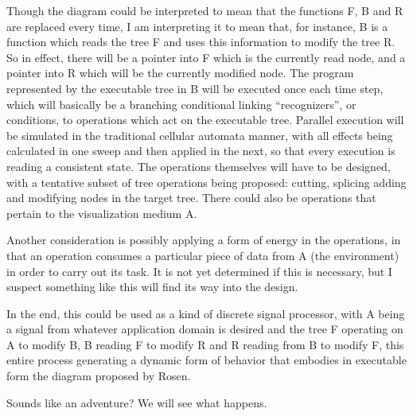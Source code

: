 \documentclass[12pt]{article}
\begin{document}
Though the diagram could be interpreted to mean that the functions F, B and R are replaced every time, I am interpreting it to mean that, for instance, B is a function which reads the tree F and uses this information to modify the tree R.  So in effect, there will be a pointer into F which is the currently read node, and a pointer into R which will be the currently modified node.  The program represented by the executable tree in B will be executed once each time step, which will basically be a branching conditional linking ``recognizers'', or conditions, to operations which act on the executable tree.  Parallel execution will be simulated in the traditional cellular automata manner, with all effects being calculated in one sweep and then applied in the next, so that every execution is reading a consistent state.  The operations themselves will have to be designed, with a tentative subset of tree operations being proposed: cutting, splicing adding and modifying nodes in the target tree.  There could also be operations that pertain to the visualization medium A.  

Another consideration is possibly applying a form of energy in the operations, in that an operation consumes a particular piece of data from A (the environment) in order to carry out its task.  It is not yet determined if this is necessary, but I suspect something like this will find its way into the design.

In the end, this could be used as a kind of discrete signal processor, with A being a signal from whatever application domain is desired and the tree F operating on A to modify B, B reading F to modify R and R reading from B to modify F, this entire process generating a dynamic form of behavior that embodies in executable form the diagram proposed by Rosen.  

Sounds like an adventure?  We will see what happens.



\end{document}
